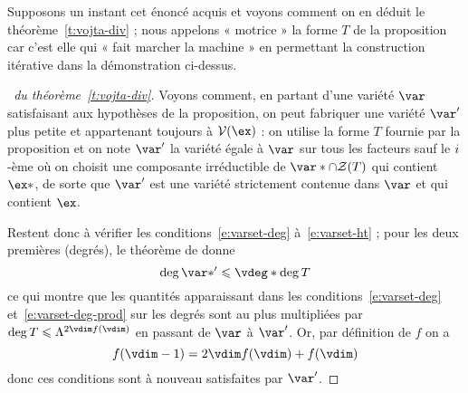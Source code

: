 Supposons un instant cet énoncé acquis et voyons comment on en déduit le
théorème~\vref{t:vojta-div} ; nous appelons « motrice » la forme \( T \) de la
proposition car c'est elle qui « fait marcher la machine » en permettant la
construction itérative dans la démonstration ci-dessus.

\begin{proof}[\proofname\ du théorème~\vref{t:vojta-div}]
  Voyons comment, en partant d'une variété \( \var \) satisfaisant aux
  hypothèses de la proposition, on peut fabriquer une variété \( \var' \) plus
  petite et appartenant toujours à \( \varset(\ex) \) : on utilise la forme
  \( T \) fournie par la proposition et on note
  \( \var' \) la variété égale à \( \var \) sur tous les facteurs sauf le \(
    i \)-ème où on choisit une composante irréductible de
  \( \var* \cap \zeros T \) qui contient \( \ex* \), de sorte que \( \var' \)
  est une variété strictement contenue dans \( \var \) et qui contient \( \ex
  \).

  Restent donc à vérifier les conditions~\eqref{e:varset-deg}
  à~\eqref{e:varset-ht} ; pour les deux premières (degrés), le théorème de
   donne
  \begin{equation}
    \deg \var*' \le \vdeg* \deg T
  \end{equation}
  ce qui montre que les quantités apparaissant dans les
  conditions~\eqref{e:varset-deg} et~\eqref{e:varset-deg-prod} sur les degrés
  sont au plus multipliées par \( \deg T \le \Lambda^{2\vdim f(\vdim)} \) en
  passant de \( \var \) à \( \var' \). Or, par définition de \( f \) on a
  \begin{equation} \label{e:ct-f}
    f(\vdim-1) = 2\vdim f(\vdim) + f(\vdim)
  \end{equation}
  donc ces conditions sont à nouveau satisfaites par \( \var' \).


\end{proof}
